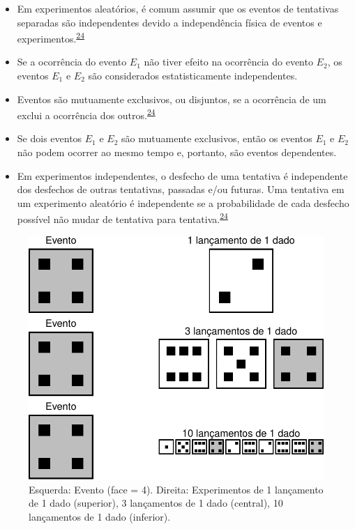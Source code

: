 \documentclass[
  a4paper,
]{book}
\begin{document}
\begin{itemize}
\item
  Em experimentos aleatórios, é comum assumir que os eventos de tentativas separadas são independentes devido a independência física de eventos e experimentos.\textsuperscript{\protect\hyperlink{ref-grami2023}{24}}
\item
  Se a ocorrência do evento \(E_{1}\) não tiver efeito na ocorrência do evento \(E_{2}\), os eventos \(E_{1}\) e \(E_{2}\) são considerados estatisticamente independentes.
\item
  Eventos são mutuamente exclusivos, ou disjuntos, se a ocorrência de um exclui a ocorrência dos outros.\textsuperscript{\protect\hyperlink{ref-grami2023}{24}}
\item
  Se dois eventos \(E_{1}\) e \(E_{2}\) são mutuamente exclusivos, então os eventos \(E_{1}\) e \(E_{2}\) não podem ocorrer ao mesmo tempo e, portanto, são eventos dependentes.
\item
  Em experimentos independentes, o desfecho de uma tentativa é independente dos desfechos de outras tentativas, passadas e/ou futuras. Uma tentativa em um experimento aleatório é independente se a probabilidade de cada desfecho possível não mudar de tentativa para tentativa.\textsuperscript{\protect\hyperlink{ref-grami2023}{24}}
\end{itemize}

\begin{figure}

{\centering \includegraphics{Ciencia-com-R_files/figure-latex/independencia-dado-1} 

}

\caption{Esquerda: Evento (face = 4). Direita: Experimentos de 1 lançamento de 1 dado (superior), 3 lançamentos de 1 dado (central), 10 lançamentos de 1 dado (inferior).}\label{fig:independencia-dado}
\end{figure}
\end{document}
